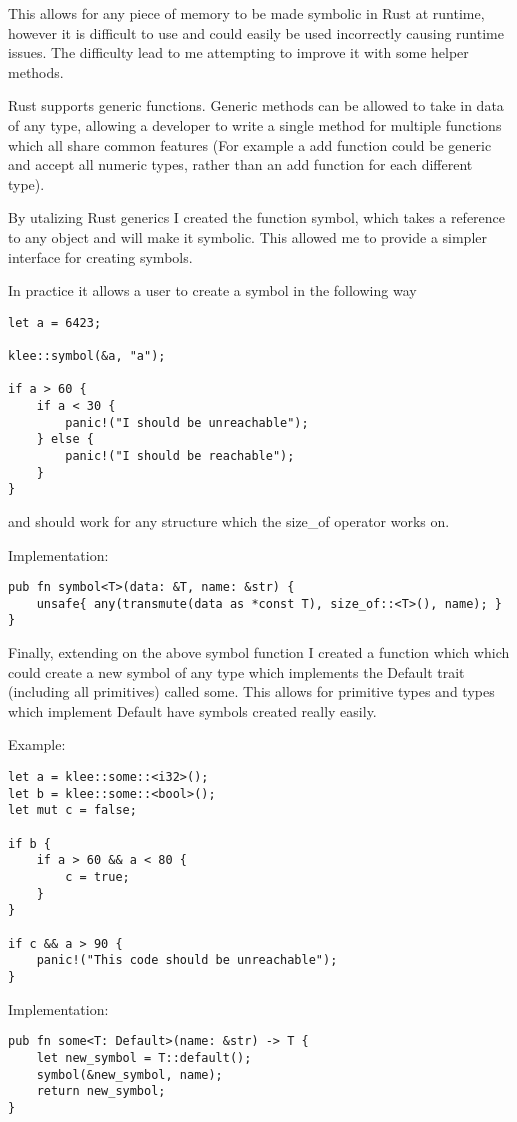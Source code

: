 \documentclass{report}
\begin{document}
This allows for any piece of memory to be made symbolic in Rust at runtime, however it is difficult to use and could easily be used incorrectly causing runtime issues. The difficulty lead to me attempting to improve it with some helper methods.

Rust supports generic functions. Generic methods can be allowed to take in data of any type, allowing a developer to write a single method for multiple functions which all share common features (For example a add function could be generic and accept all numeric types, rather than an add function for each different type).

By utalizing Rust generics I created the function symbol, which takes a reference to any object and will make it symbolic. This allowed me to provide a simpler interface for creating symbols.

In practice it allows a user to create a symbol in the following way

\begin {lstlisting}
let a = 6423;

klee::symbol(&a, "a");

if a > 60 {
	if a < 30 {
		panic!("I should be unreachable");
	} else {
		panic!("I should be reachable");
	}
}
\end {lstlisting}

and should work for any structure which the size_of operator works on.

Implementation:
\begin {lstlisting}
pub fn symbol<T>(data: &T, name: &str) {
    unsafe{ any(transmute(data as *const T), size_of::<T>(), name); }
}
\end {lstlisting}

Finally, extending on the above symbol function I created a function which which could create a new symbol of any type which implements the Default trait (including all primitives) called some. This allows for primitive types and types which implement Default have symbols created really easily.

Example:
\begin{lstlisting}
let a = klee::some::<i32>();
let b = klee::some::<bool>();
let mut c = false;

if b {
	if a > 60 && a < 80 {
		c = true;
	}
}

if c && a > 90 {
	panic!("This code should be unreachable");
}
\end{lstlisting}

Implementation:
\begin{lstlisting}
pub fn some<T: Default>(name: &str) -> T {
    let new_symbol = T::default();
    symbol(&new_symbol, name);
    return new_symbol;
}
\end{lstlisting}
\end{document}
